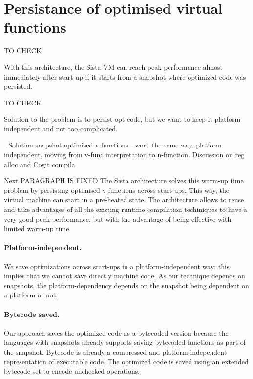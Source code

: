 \documentclass[a4paper,12pt,twoside]{../includes/ThesisStyle}
\begin{document}
\section{Persistance of optimised virtual functions}
\label{sec:persistanceSol}

TO CHECK

With this architecture, the Sista VM can reach peak performance almost immediately after start-up if it starts from a snapshot where optimized code was persisted.

TO CHECK



Solution to the problem is to persist opt code, but we want to keep it platform-independent and not too complicated.

- Solution snapshot optimised v-functions - work the same way.
platform independent, moving from v-func interpretation to n-function.
Discussion on reg alloc and Cogit compila


Next PARAGRAPH IS FIXED
The Sista architecture solves this warm-up time problem by persisting optimised v-functions across start-ups. This way, the virtual machine can start in a pre-heated state. The architecture allows to reuse and take advantages of all the existing runtime compilation techiniques to have a very good peak performance, but with the advantage of being effective with limited warm-up time. 



\paragraph{Platform-independent.}We save optimizations across start-ups in a platform-independent way: this implies that we cannot save directly machine code. As our technique depends on snapshots, the platform-dependency depends on the snapshot being dependent on a platform or not. 

\paragraph{Bytecode saved.}Our approach saves the optimized code as a bytecoded version because the languages with snapshots already supports saving bytecoded functions as part of the snapshot. Bytecode is already a compressed and platform-independent representation of executable code. The optimized code is saved using an extended bytecode set to encode unchecked operations. %
\end{document}
